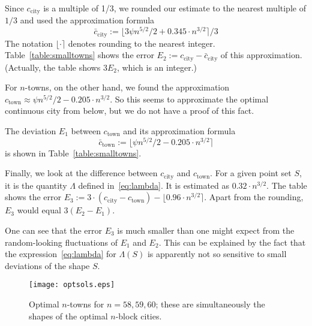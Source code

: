 \documentclass[preprint,authoryear,12pt]{elsarticle}
\begin{document}
Since $c_{\textrm{city}}$ is a multiple of 1/3, we rounded our estimate to the
nearest multiple of $1/3$ and used the approximation formula
$$\bar c_{\textrm{city}} :=
\lfloor 3\psi n^{5/2}/2 + 0.345\cdot n^{3/2}\rceil/3$$
The notation $\lfloor \cdot\rceil$ denotes rounding to the nearest integer.
Table~\ref{table:smalltowns} shows the error $E_2 := c_{\textrm{city}}-\bar
c_{\textrm{city}}$ of this approximation.  (Actually, the table shows $3E_2$,
which is an integer.)

For $n$-towns, on the other hand, we found the approximation
$c_{\textrm{town}} \approx
 \psi n^{5/2}/2 - 0.205\cdot n^{3/2}$.
So this seems to approximate the
optimal continuous city from below, but we do not have a proof of this fact.

The deviation $E_1$
between $c_{\textrm{town}}$
and its approximation formula
$$\bar c_{\textrm{town}} := \lfloor \psi n^{5/2}/2 - 0.205\cdot n^{3/2}\rceil$$
is shown in
Table~\ref{table:smalltowns}.

Finally, we look at
the difference between $c_{\textrm{city}}$ and $c_{\textrm{town}}$.
For a given point set $S$, it is the quantity $\Lambda$
defined in~\eqref{eq:lambda}.  It is estimated as $0.32\cdot n^{3/2}$.
The table shows the error
 $E_3 := 3\cdot(c_{\textrm{city}}-c_{\textrm{town}})-\lfloor 0.96\cdot n^{3/2}\rceil$.
Apart from the rounding, $E_3$ would equal $3(E_2-E_1)$.

One can see that the error $E_3$ is much smaller than one might
expect from the random-looking fluctuations of $E_1$ and $E_2$.
This can be explained by the fact that the expression~\eqref{eq:lambda}
 for $\Lambda(S)$
is apparently not so sensitive to small deviations of the shape $S$.




\begin{figure}[t]
\begin{center}
\texttt{[image: optsols.eps]} \caption{Optimal
$n$-towns for $n=58,59,60$; these are simultaneously the shapes of
the optimal $n$-block cities.}
\label{optsols}
\end{center}
\end{figure}
\end{document}
